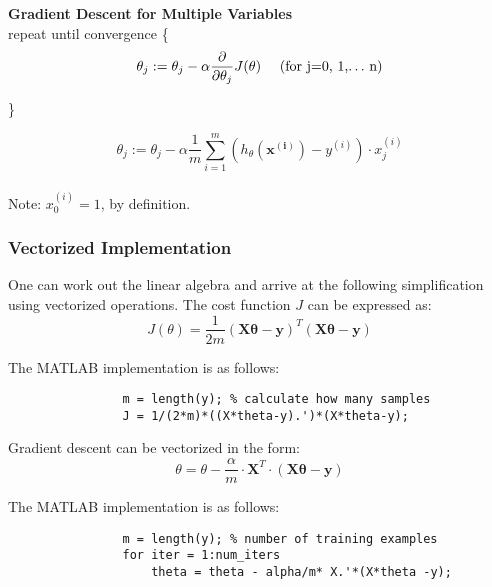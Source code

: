         
                \textbf{Gradient Descent for Multiple Variables} \\
                
                        repeat until convergence \{  
                            \[ \theta_j := \theta_j - \alpha \frac{\partial }{\partial \theta_j} J(\mathbf{\theta})\mbox{\hspace{10pt} (for j=0, 1,$\ldots$ n)}  
                            \] 

                        \}  


                        
                       \[\theta_j := \theta_j - \alpha \frac{1}{m} \sum_{i=1}^{m} (h_\theta(\mathbf{x^{(i)}}) - y^{(i)} ) \cdot x_j^{(i)}\] \\ 
                       
                       Note: $x_0^{(i)} = 1$, by definition.
        
         \subsubsection{Vectorized Implementation}

         One can work out the linear algebra and arrive at the following simplification using vectorized operations.
            The cost function $J$ can be expressed as:
            \begin{equation}
                J(\theta) = \frac{1}{2m} (\mathbf{X\theta} - \mathbf{y})^T (\mathbf{X\theta} - \mathbf{y} )
                \label{eq:vectorized-cost}
            \end{equation}
            
            The MATLAB implementation is as follows:
            \begin{lstlisting}
                m = length(y); % calculate how many samples 
                J = 1/(2*m)*((X*theta-y).')*(X*theta-y);

            \end{lstlisting}


            Gradient descent can be vectorized in the form:
            \begin{equation}
                \theta = \theta - \frac{\alpha}{m} \cdot \mathbf{X}^T \cdot (\mathbf{X\theta} - \mathbf{y}) 
                \label{eq:vectorized-gradient-descent}
            \end{equation}

            The MATLAB implementation is as follows:
            \begin{lstlisting}
                m = length(y); % number of training examples
                for iter = 1:num_iters
                    theta = theta - alpha/m* X.'*(X*theta -y);
            \end{lstlisting}


